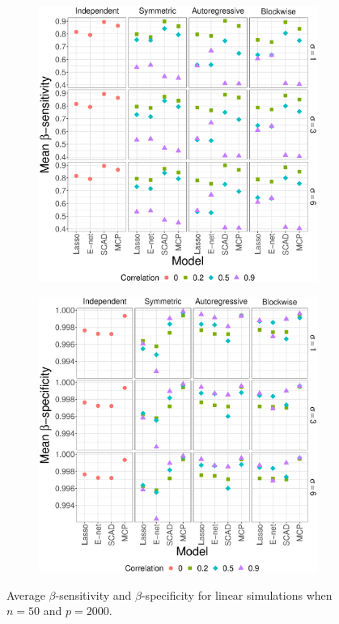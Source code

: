 \documentclass{article}
\begin{document}
	\begin{figure}[!htb]
		\centering
		\begin{subfigure}[b]{0.47\textwidth}
			\includegraphics[width=\textwidth]{images/facet/publication_facet_sensitivity_linear_50_2000.eps}
			\label{fig:linear-sensitivity}
		\end{subfigure}
		\hspace{6pt}
		\begin{subfigure}[b]{0.47\textwidth}
			\includegraphics[width=\textwidth]{images/facet/publication_facet_specificity_linear_50_2000.eps}
			\label{fig:linear-specificity}
		\end{subfigure}
		\caption{Average $\beta$-sensitivity and $\beta$-specificity for linear simulations when $n = 50$ and $p = 2000$.}
		\label{fig:linear-beta}
	\end{figure}
\end{document}
